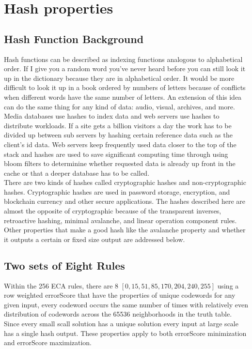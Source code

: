 \documentclass[11pt]{article}
\begin{document}
\section{Hash properties}

\subsection{Hash Function Background}

Hash functions can be described as indexing functions analogous to alphabetical order. If I give you a random word you've never heard before you can still look it up in the dictionary because they are in alphabetical order. It would be more difficult to look it up in a book ordered by numbers of letters because of conflicts when different words have the same number of letters. An extension of this idea can do the same thing for any kind of data: audio, visual, archives, and more. Media databases use hashes to index data and web servers use hashes to distribute workloads. If a site gets a billion visitors a day the work has to be divided up between sub servers by hashing certain reference data such as the client's id data. Web servers keep frequently used data closer to the top of the stack and hashes are used to save significant computing time through using bloom filters to determinine whether requested data is already up front in the cache or that a deeper database has to be called.\\

There are two kinds of hashes called cryptographic hashes and non-cryptographic hashes. Cryptographic hashes are used in password storage, encryption, and blockchain currency and other secure applications. The hashes described here are almost the opposite of cryptographic because of the transparent inverses, retroactive hashing, minimal avalanche, and linear operation component rules. Other properties that make a good hash like the avalanche property and whether it outputs a certain or fixed size output are addressed below.\\

\subsection{Two sets of Eight Rules}
Within the 256 ECA rules, there are 8 $[0,15,51,85,170,204,240,255]$ using a row weighted errorScore that have the properties of unique codewords for any given input, every codeword occurs the same number of times with relatively even distribution of codewords across the 65536 neighborhoods in the truth table.  Since every small scall solution has a unique solution every input at large scale has a single hash output. These properties apply to both errorScore minimization and errorScore maximization. \\
\end{document}
